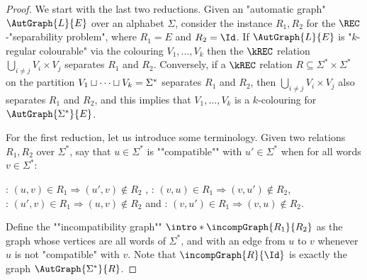 \begin{proof}
   We start with the last two reductions.
    Given an "automatic graph" $\AutGraph{L}{E}$ over an alphabet $\Sigma$, consider the instance $R_1,R_2$ for the $\REC$-"separability problem", where 
    $R_1 = E$ and $R_2 = \Id$. 
    If $\AutGraph{L}{E}$ is "$k$-regular colourable" via the colouring $V_1, \dotsc, V_k$ then the $\kREC$ relation
    $\bigcup_{i \neq j} V_i \times V_j$ separates $R_1$ and $R_2$.
    Conversely, if a $\kREC$ relation $R \subseteq \Sigma^* \times \Sigma^*$ on the partition $V_1 \sqcup \dotsb \sqcup V_k = \Sigma^*$ separates $R_1$ and $R_2$, then $\bigcup_{i \neq j} V_i \times V_j$ also separates $R_1$ and $R_2$, and this implies that $V_1, \dotsc, V_k$ is a $k$-colouring for $\AutGraph{\Sigma^*}{E}$.

\AP For the first reduction, let us introduce some terminology.
Given two relations $R_1,R_2$ over $\Sigma^*$, say that $u \in \Sigma^*$ is ""compatible"" with
$u' \in \Sigma^*$ when for all words $v \in \Sigma^*$:
\begin{center}
    \intro*\compL: $(u,v) \in R_1 \Rightarrow (u',v) \not\in R_2$%
    ,\hphantom{\quad and \quad}
    \intro*\compR: $(v,u) \in R_1 \Rightarrow (v,u') \not\in R_2$,\\
    \intro*\compLpr: $(u',v) \in R_1 \Rightarrow (u,v) \not\in R_2$%
    \hphantom{,}\quad and \quad
    \intro*\compRpr: $(v,u') \in R_1 \Rightarrow (v,u) \not\in R_2$.
\end{center}
\AP
Define the ""incompatibility graph"" $\intro*\incompGraph{R_1}{R_2}$
as the graph whose vertices are all words of $\Sigma^*$,
and with an edge from $u$ to $v$ whenever $u$ is not "compatible" with $v$.
Note that $\incompGraph{R}{\Id}$ is exactly the graph $\AutGraph{\Sigma^*}{R}$.


\end{proof}
